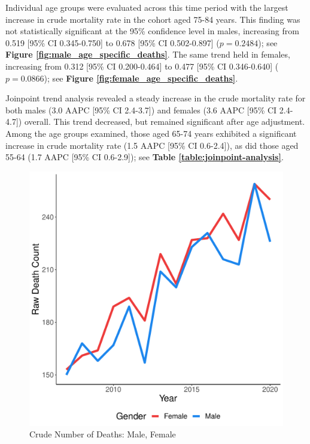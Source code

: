 \documentclass[12pt]{article}
\begin{document}
\par \bigskip

\noindent Individual age groups were evaluated across this time period with the largest increase in crude mortality rate in the cohort aged 75-84 years. This finding was not statistically significant at the 95\% confidence level in males, increasing from 0.519 [95\% CI 0.345-0.750] to 0.678 [95\% CI 0.502-0.897] ($p = 0.2484$); see \textbf{Figure \ref{fig:male_age_specific_deaths}}. The same trend held in females, increasing from 0.312 [95\% CI 0.200-0.464] to 0.477 [95\% CI 0.346-0.640] ($p = 0.0866$); see \textbf{Figure \ref{fig:female_age_specific_deaths}}.

\par \bigskip

\noindent Joinpoint trend analysis revealed a steady increase in the crude mortality rate for both males (3.0 AAPC [95\% CI 2.4-3.7]) and females (3.6 AAPC [95\% CI 2.4-4.7]) overall. This trend decreased, but remained significant after age adjustment. Among the age groups examined, those aged 65-74 years exhibited a significant increase in crude mortality rate (1.5 AAPC [95\% CI 0.6-2.4]), as did those aged 55-64 (1.7 AAPC [95\% CI 0.6-2.9]); see \textbf{Table \ref{table:joinpoint-analysis}}.


\newpage

\begin{figure}
    \centering
    \includegraphics[scale=0.5]{analysis/output/raw_deaths_by_gender_plot.pdf}
    \caption{Crude Number of Deaths: Male, Female}
    \label{fig:crude_deaths_by_gender}
\end{figure}
\end{document}
